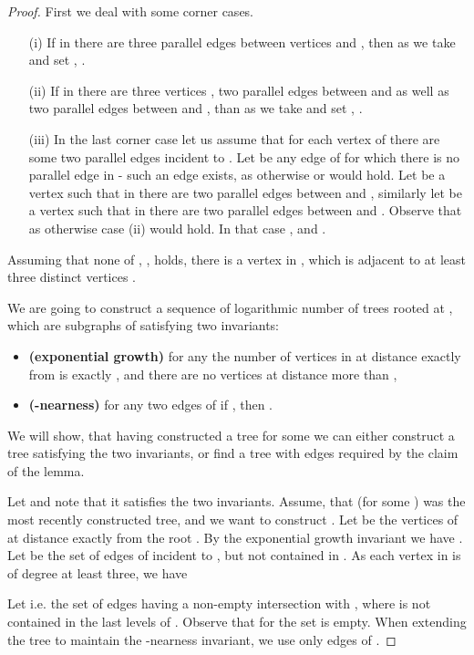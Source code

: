 \documentclass[11pt]{article}
\theoremstyle{definition}
\begin{document}
\begin{proof}
First we deal with some corner cases. 
\begin{itemize}
\item[(i)] If in  there are three parallel edges  between vertices  and ,
then as  we take  and set , .
\item[(ii)] If in  there are three vertices , two parallel edges  between  and 
as well as two parallel edges  between  and , 
than as  we take  and set , .
\item[(iii)] In the last corner case let us assume that for each vertex  of 
there are some two parallel edges  incident to .
Let  be any edge of  for which there is no parallel edge in  -
such an edge exists, as otherwise  or  would hold.
Let  be a vertex such that in  there are two parallel edges  between  and ,
similarly let  be a vertex such that in  there are two parallel edges  between  and .
Observe that  as otherwise case (ii) would hold.
In that case ,  and .
\end{itemize}
Assuming that none of , ,  holds,
there is a vertex  in , which is adjacent to at least three distinct vertices .

We are going to construct a sequence of logarithmic number of trees  rooted at , which are subgraphs of  satisfying two invariants:
\begin{itemize}
  \item {\bf (exponential growth)} for any  the number of vertices in 
  at distance exactly  from  is exactly ,
  and there are no vertices at distance more than ,
  \item{\bf (-nearness)} for any two edges  of  if ,
  then .
\end{itemize}
We will show, that having constructed a tree  for some  we
can either construct a tree  satisfying the two invariants,
or find a tree  with edges  required by the claim of the lemma.

Let  and note that it satisfies the two invariants.
Assume, that  (for some ) was the most recently constructed tree,
and we want to construct .
Let  be the vertices of  at distance exactly  from the root .
By the exponential growth invariant we have .
Let  be the set of edges of  incident to , but not contained in .
As each vertex in  is of degree at least three, we have

Let 
i.e. the set of edges having a non-empty intersection with , where  is not contained
in the last  levels of .  Observe that for  the set  is empty.
When extending the tree  to maintain the -nearness invariant,
we use only edges of .


\end{proof}
\end{document}
